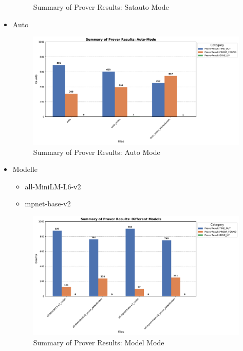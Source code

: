 \documentclass[german,version-2020-11]{uzl-thesis}
\begin{document}
\begin{itemize}
\begin{figure}[h!]
      \caption{Summary of Prover Results: Satauto Mode}
      \label{fig:prover_results_satauto}
    \end{figure}
    \clearpage
    \item Auto
    \begin{figure}[h!]
      \centering
      \includegraphics[width=\textwidth]{auto_mode_output.pdf} %
      \caption{Summary of Prover Results: Auto Mode}
      \label{fig:prover_results_auto}
    \end{figure}
    \clearpage
    \item Modelle
    \begin{itemize}
      \item all-MiniLM-L6-v2
      \item mpnet-base-v2
    \end{itemize}
    \begin{figure}[h!]
      \centering
      \includegraphics[width=\textwidth]{different_mode_output.pdf} %
      \caption{Summary of Prover Results: Model Mode}
      \label{fig:prover_results_model}
    \end{figure}

\end{itemize}
\end{document}
